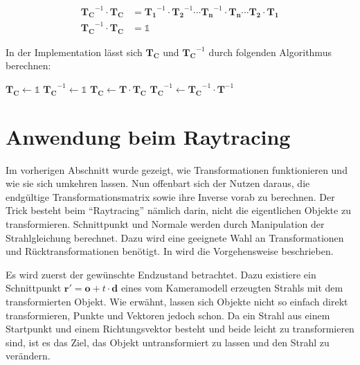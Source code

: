 \begin{align*}
    \boldsymbol{T_C}^{-1} \cdot \boldsymbol{T_C} &= \boldsymbol{T_1}^{-1} \cdot \boldsymbol{T_2}^{-1} \cdots \boldsymbol{T_n}^{-1} \cdot \boldsymbol{T_n} \cdots \boldsymbol{T_2} \cdot \boldsymbol{T_1} \\
    \boldsymbol{T_C}^{-1} \cdot \boldsymbol{T_C} &= \mathds{1}
\end{align*}

In der Implementation lässt sich \( \boldsymbol{T_C} \) und \( \boldsymbol{T_C}^{-1} \) durch folgenden Algorithmus berechnen:

\begin{algorithm}[H]
    \caption{Berechne \( \boldsymbol{T_C} \) und \( \boldsymbol{T_C}^{-1} \)}
    \label{alg:verkette_transformation}
    \begin{algorithmic}[1]
        \State \( \boldsymbol{T_C} \gets \mathds{1} \)
        \State \( \boldsymbol{T_C}^{-1} \gets \mathds{1} \)
             \State \( \boldsymbol{T_C} \gets \boldsymbol{T} \cdot \boldsymbol{T_C} \)
             \State \( \boldsymbol{T_C}^{-1} \gets \boldsymbol{T_C}^{-1} \cdot \boldsymbol{T}^{-1} \)
        \EndFor
\end{algorithmic}
\end{algorithm}
        
        
\section{Anwendung beim Raytracing}


Im vorherigen Abschnitt wurde gezeigt, wie Transformationen funktionieren und wie sie sich umkehren lassen. Nun offenbart sich der Nutzen daraus, die endgültige Transformationsmatrix sowie ihre Inverse vorab zu berechnen.
Der Trick besteht beim "`Raytracing"' nämlich darin, nicht die eigentlichen Objekte zu transformieren. Schnittpunkt und Normale werden durch Manipulation der Strahlgleichung berechnet. Dazu wird eine geeignete Wahl an Transformationen und Rücktransformationen benötigt. In \cite{suffern2007ray} wird die Vorgehensweise beschrieben.

Es wird zuerst der gewünschte Endzustand betrachtet.
Dazu existiere ein Schnittpunkt \( \boldsymbol{r'} = \boldsymbol{o} + t \cdot \boldsymbol{d} \) eines vom Kameramodell erzeugten Strahls mit dem transformierten Objekt. Wie erwähnt, lassen sich Objekte nicht so einfach direkt transformieren, Punkte und Vektoren jedoch schon. Da ein Strahl aus einem Startpunkt und einem Richtungsvektor besteht und beide leicht zu transformieren sind, ist es das Ziel, das Objekt untransformiert zu lassen und den Strahl zu verändern.

